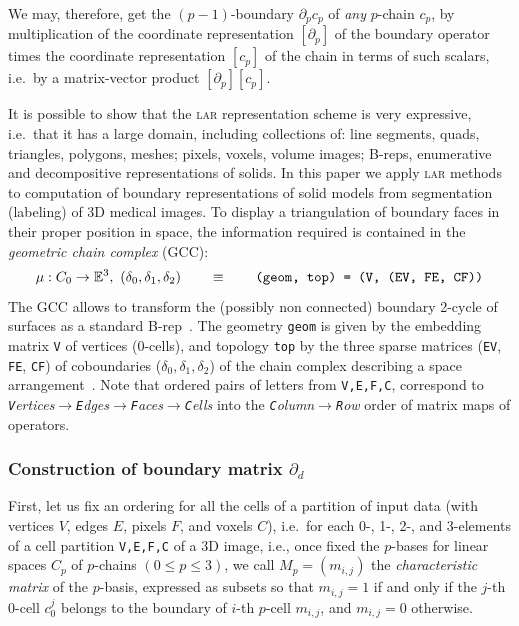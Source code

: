 We may, therefore, get the $(p-1)$-boundary $\partial_p c_p$ of \emph{any} $p$-chain $c_p$, by multiplication of the coordinate representation $[\partial_p]$ of the boundary operator times the coordinate representation $[c_p]$ of the chain in terms of such scalars, i.e.~by a  matrix-vector product $ [\partial_p] [c_p] $.

It is possible to show that the \textsc{lar} representation scheme is very expressive, i.e.~that it  has a large domain,  including collections of: line segments, quads, triangles, polygons, meshes;  pixels, voxels, volume images; B-reps, enumerative and decompositive representations of solids. 
In this paper we apply \textsc{lar} methods to computation of boundary representations of solid models from segmentation (labeling) of 3D medical images.
To display a triangulation of  boundary faces  in their proper position in space, the information required is contained in the \emph{geometric chain complex} (GCC):
\[
\mu: C_0\to\mathbb{E}^3,\ (\delta_0, \delta_1, \delta_2)
\qquad\equiv\qquad
\texttt{(geom, top) = (V, (EV, FE, CF))}
\]
The GCC allows to transform the (possibly non connected) boundary 2-cycle of surfaces as a standard B-rep~\cite{shapiroSM:202}. 
The geometry \texttt{geom} is given by
the embedding matrix \texttt{V} of vertices (0-cells), and  topology \texttt{top} by the three sparse matrices (\texttt{EV}, \texttt{FE}, \texttt{CF}) of coboundaries ($\delta_0, \delta_1, \delta_2$) of the chain complex describing a   
space arrangement~\cite{paoluzzi2019finite}.
Note that ordered pairs of letters from \texttt{V,E,F,C}, correspond to \emph{\emph{\texttt{V}}ertices$\to$\emph{\texttt{E}}dges$\to$\emph{\texttt{F}}aces$\to$\emph{\texttt{C}}ells} into the 
\emph{\emph{\texttt{C}}olumn$\to$\emph{\texttt{R}}ow} order of matrix maps of operators.



\subsubsection*{Construction of boundary matrix $\partial_d$}

First, let us fix an ordering for all the cells of a partition of input data (with vertices $V$, edges $E$, pixels $F$, and voxels $C$), i.e.~for each 0-, 1-, 2-, and 3-elements of a cell partition \texttt{V,E,F,C} of a 3D image, i.e., once fixed the $p$-bases for linear spaces $C_p$ of $p$-chains $(0\leq p\leq 3)$, we call $M_p = (m_{i,j})$ the \emph{characteristic matrix} of the $p$-basis, expressed as subsets so that 
$m_{i,j}=1$ if and only if the $j$-th  $0$-cell $c^j_0$ belongs 
to the boundary of $i$-th $p$-cell $m_{i,j}$, and $m_{i,j}=0$ otherwise.  

